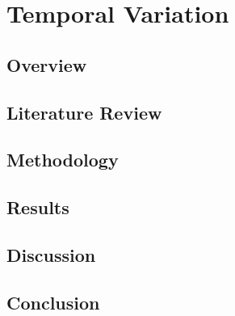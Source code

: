 \chapter{Temporal Variation}
\section{Overview}
\section{Literature Review}
\section{Methodology}
\section{Results}
\section{Discussion}
\section{Conclusion}